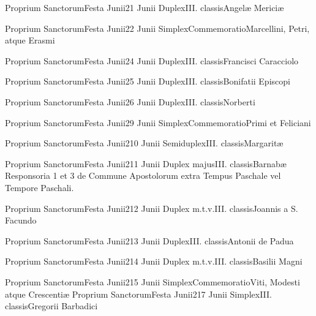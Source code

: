 \documentclass[liber-responsorialis_aestivus.tex]{subfiles}
\begin{document}

	{Proprium Sanctorum}{Festa Junii}{2}{1 Junii}
	{Duplex}{III. classis}{Angelæ Mericiæ}
	{\vnrubric}
	{\respdetemp}

	{Proprium Sanctorum}{Festa Junii}{2}{2 Junii}
	{Simplex}{Commemoratio}{Marcellini, Petri, atque Erasmi}
	{}
	{}
\rubric{\respdetemp}

	{Proprium Sanctorum}{Festa Junii}{2}{4 Junii}
	{Duplex}{III. classis}{Francisci Caracciolo}
	{\coporubric}
	{\respdetemp}

	{Proprium Sanctorum}{Festa Junii}{2}{5 Junii}
	{Duplex}{III. classis}{Bonifatii Episcopi}
	{\umvelrubric}
	{\respdetemp}

	{Proprium Sanctorum}{Festa Junii}{2}{6 Junii}
	{Duplex}{III. classis}{Norberti}
	{\coporubric}
	{\respdetemp}

	{Proprium Sanctorum}{Festa Junii}{2}{9 Junii}
	{Simplex}{Commemoratio}{Primi et Feliciani}
	{}
	{}
\rubric{\respdetemp}

	{Proprium Sanctorum}{Festa Junii}{2}{10 Junii}
	{Semiduplex}{III. classis}{Margaritæ}
	{\nnrubric}
	{\respdetemp}

	{Proprium Sanctorum}{Festa Junii}{2}{11 Junii}
	{Duplex majus}{III. classis}{Barnabæ}
	{\apvelrubric}
	{Responsoria 1 et 3 de Commune Apostolorum extra Tempus Paschale vel Tempore Paschali.}

	{Proprium Sanctorum}{Festa Junii}{2}{12 Junii}
	{Duplex m.t.v.}{III. classis}{Joannis a S. Facundo}
	{\conprubric}
	{\respdetemp}

	{Proprium Sanctorum}{Festa Junii}{2}{13 Junii}
	{Duplex}{III. classis}{Antonii de Padua}
	{\conprubric}
	{\respdetemp}

	{Proprium Sanctorum}{Festa Junii}{2}{14 Junii}
	{Duplex m.t.v.}{III. classis}{Basilii Magni}
	{\conpdorubric}
	{\respdetemp}

	{Proprium Sanctorum}{Festa Junii}{2}{15 Junii}
	{Simplex}{Commemoratio}{Viti, Modesti atque Crescentiæ}
	{}
	{}
\rubric{\respdetemp}
	{Proprium Sanctorum}{Festa Junii}{2}{17 Junii}
	{Simplex}{III. classis}{Gregorii Barbadici}
	{}
	{}
\rubric{\respdetemp}
\end{document}

